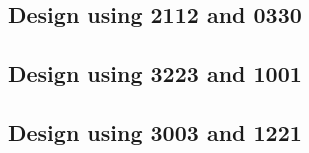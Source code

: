 \subsection{Design using 2112 and 0330}


 \begin{center}




 \end{center}



\subsection{Design using 3223 and 1001}


 \begin{center}




 \end{center}



\subsection{Design using 3003 and 1221}


 \begin{center}




 \end{center}



